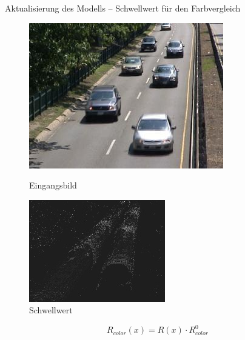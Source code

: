 \documentclass[hyperref={pdfpagelabels=false}]{beamer}
\begin{document}
\begin{frame}[t]{Aktualisierung des Modells -- Schwellwert für den Farbvergleich}
	\begin{figure}
		\centering
		\begin{minipage}{0.45\linewidth}
			\includegraphics[width=1\linewidth]{Abbildungen/Eingang3.jpg}
			\caption*{Eingangsbild}
		\end{minipage}
		\begin{minipage}{0.45\linewidth}
			\includegraphics[width=1\linewidth]{Abbildungen/R_color.jpg}
			\caption*{Schwellwert}
		\end{minipage}
	\end{figure}
	\bigskip
	\begin{equation*}
		R_{color}(x) = R(x) \cdot R^0_{color} 	
	\end{equation*}
\end{frame}
\end{document}
